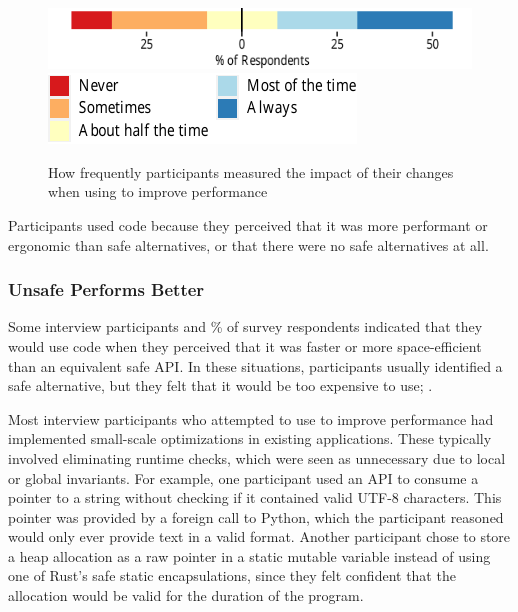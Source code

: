 \begin{figure}
\centering
\caption{How frequently participants measured the impact of their changes when using \unsafe to improve performance}
\label{fig:rq2:profiling}
\includegraphics[width=\columnwidth]{figures/compiled/rq2_profiling.pdf}
\includegraphics{figures/compiled/legends/legend_frequency_wrapped.pdf}
\end{figure}

Participants used \unsafe code because they perceived that it was more performant or ergonomic than safe alternatives, or that there were no safe alternatives at all.

\subsubsection{Unsafe Performs Better}
Some interview participants and \% of survey respondents indicated that they would use \unsafe code when they perceived that it was faster or more space-efficient than an equivalent safe API. In these situations, participants usually identified a safe alternative, but they felt that it would be too expensive to use; . 

Most interview participants who attempted to use \unsafe to improve performance had implemented small-scale optimizations in existing applications. These typically involved eliminating runtime checks, which were seen as unnecessary due to local or global invariants. For example, one participant used an \unsafe API to consume a pointer to a string without checking if it contained valid UTF-8 characters. This pointer was provided by a foreign call to Python, which the participant reasoned would only ever provide text in a valid format. Another participant chose to store a heap allocation as a raw pointer in a static mutable variable instead of using one of Rust's safe static encapsulations, since they felt confident that the allocation would be valid for the duration of the program.


